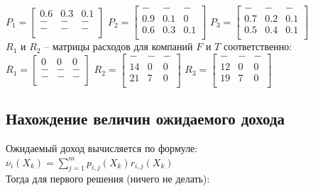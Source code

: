 \documentclass[14pt,a4paper,report]{report}
\begin{document}
$
P_1=\begin{bmatrix}
0.6 & 0.3 & 0.1 \\
- & - & - \\
- & - & - \\
\end{bmatrix}
$
$
P_2=\begin{bmatrix}
- & - & - \\
0.9 & 0.1 & 0 \\
0.6 & 0.3 & 0.1 \\
\end{bmatrix}
$
$
P_3=\begin{bmatrix}
- & - & - \\
0.7 & 0.2 & 0.1 \\
0.5 & 0.4 & 0.1 \\
\end{bmatrix}
$\\

$R_1$ и $R_2$ -- матрицы расходов для компаний $F$ и $T$ соответственно:
\\

$
R_1=\begin{bmatrix}
0 & 0 & 0 \\
- & - & - \\
- & - & - \\
\end{bmatrix}
$
$
R_2=\begin{bmatrix}
- & - & - \\
14 & 0 & 0 \\
21 & 7 & 0 \\
\end{bmatrix}
$
$
R_3=\begin{bmatrix}
- & - & - \\
12 & 0 & 0 \\
19 & 7 & 0 \\
\end{bmatrix}
$\\

\subsection{Нахождение величин ожидаемого дохода}

Ожидаемый доход вычисляется по формуле:\\

$\nu_i(X_{k})=\sum_{j=1}^{m}p_{i,j}(X_{k})r_{i,j}(X_{k})$\\

Тогда для первого решения (ничего не делать):\\
\end{document}
